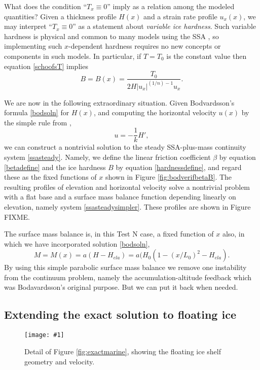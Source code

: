 \documentclass[twocolumn,letterpaper]{igs}
\newcommand{\onecol}[1]{\texttt{[image: \#1]}}
\begin{document}
What does the condition ``$T_x\equiv 0$'' imply as a relation among the modeled quantities?  Given a thickness profile $H(x)$ and a strain rate profile $u_x(x)$, we may interpret ``$T_x\equiv 0$'' as a statement about \emph{variable ice hardness}.  Such variable hardness is physical and common to many models using the SSA \citep{BBssasliding}, so implementing such $x$-dependent hardness requires no new concepts or components in such models.  In particular, if $T=T_0$ is the constant value then equation \eqref{schoofsT} implies
\begin{equation}
B = B(x) = \frac{T_0}{2 H |u_x|^{(1/n)-1} u_x}. \label{hardnessdefine}
\end{equation}

We are now in the following extraordinary situation.  Given Bodvardsson's formula \eqref{bodsoln} for $H(x)$, and computing the horizontal velocity $u(x)$ by the simple rule from \cite{Bodvardsson},
	$$u = -\frac{1}{k} H',$$
we can construct a nontrivial solution to the steady SSA-plus-mass continuity system \eqref{ssasteady}.  Namely, we define the linear friction coefficient $\beta$ by equation \eqref{betadefine} and the ice hardness $B$ by equation \eqref{hardnessdefine}, and regard these as the fixed functions of $x$ shown in Figure \ref{fig:bodverifbetaB}.  The resulting profiles of elevation and horizontal velocity solve a nontrivial problem with a flat base and a surface mass balance function depending linearly on elevation, namely system \eqref{ssasteadysimpler}.  These profiles are shown in Figure FIXME.

The surface mass balance is, in this Test N case, a fixed function of $x$ also, in which we have incorporated solution \eqref{bodsoln},
	$$M = M(x) = a(H-H_{ela}) = a(H_0(1 - (x/L_0)^2 - H_{ela}).$$
By using this simple parabolic surface mass balance we remove one instability from the continuum problem, namely the accumulation-altitude feedback which was Bodavardsson's original purpose.  But we can put it back when needed.

\subsection*{Extending the exact solution to floating ice}

\begin{figure}[ht]
\onecol{exactmarine-geometry-detail}
\caption{Detail of Figure \ref{fig:exactmarine}, showing the floating ice shelf geometry and velocity.} \label{fig:exactmarine-detail}
\end{figure}
\end{document}
